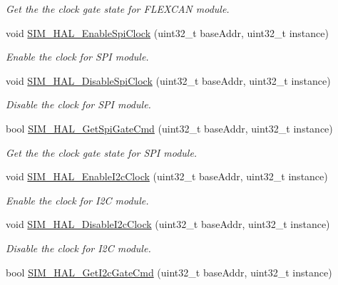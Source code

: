 \begin{DoxyCompactItemize}
\begin{DoxyCompactList}\small\item\em Get the the clock gate state for F\+L\+E\+X\+C\+AN module. \end{DoxyCompactList}\item 
void \hyperlink{group__sim__hal_gad1a3bb7c4726675b16b83e5f9f2aef55}{S\+I\+M\+\_\+\+H\+A\+L\+\_\+\+Enable\+Spi\+Clock} (uint32\+\_\+t base\+Addr, uint32\+\_\+t instance)
\begin{DoxyCompactList}\small\item\em Enable the clock for S\+PI module. \end{DoxyCompactList}\item 
void \hyperlink{group__sim__hal_gae81a0facec089e77cc49c97948e12b5f}{S\+I\+M\+\_\+\+H\+A\+L\+\_\+\+Disable\+Spi\+Clock} (uint32\+\_\+t base\+Addr, uint32\+\_\+t instance)
\begin{DoxyCompactList}\small\item\em Disable the clock for S\+PI module. \end{DoxyCompactList}\item 
bool \hyperlink{group__sim__hal_ga4ba38b56fdf7914c4becc63033695874}{S\+I\+M\+\_\+\+H\+A\+L\+\_\+\+Get\+Spi\+Gate\+Cmd} (uint32\+\_\+t base\+Addr, uint32\+\_\+t instance)
\begin{DoxyCompactList}\small\item\em Get the the clock gate state for S\+PI module. \end{DoxyCompactList}\item 
void \hyperlink{group__sim__hal_ga386cba00c2fdb7955a6402cee38f2691}{S\+I\+M\+\_\+\+H\+A\+L\+\_\+\+Enable\+I2c\+Clock} (uint32\+\_\+t base\+Addr, uint32\+\_\+t instance)
\begin{DoxyCompactList}\small\item\em Enable the clock for I2C module. \end{DoxyCompactList}\item 
void \hyperlink{group__sim__hal_gaec4373675698eda5048063dcef82b4da}{S\+I\+M\+\_\+\+H\+A\+L\+\_\+\+Disable\+I2c\+Clock} (uint32\+\_\+t base\+Addr, uint32\+\_\+t instance)
\begin{DoxyCompactList}\small\item\em Disable the clock for I2C module. \end{DoxyCompactList}\item 
bool \hyperlink{group__sim__hal_ga23870a6de0d0dfcc3bc9ad2ba0142f12}{S\+I\+M\+\_\+\+H\+A\+L\+\_\+\+Get\+I2c\+Gate\+Cmd} (uint32\+\_\+t base\+Addr, uint32\+\_\+t instance)

\end{DoxyCompactItemize}
